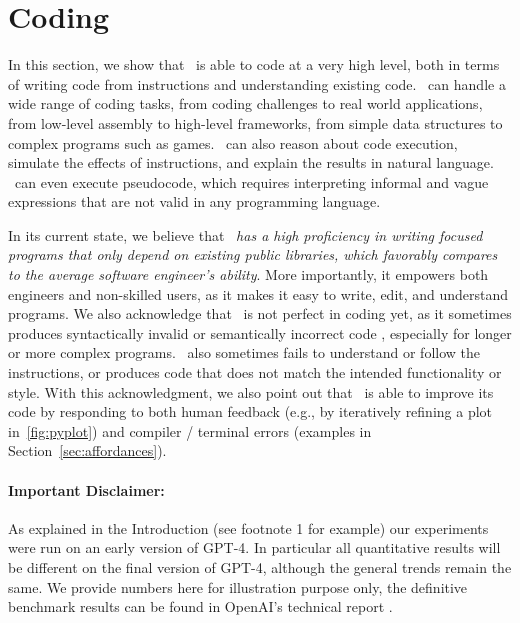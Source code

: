 \newpage
\section{Coding}
\label{sec:code}
\vspace{-3mm}
In this section, we show that \DV\ is able to code at a very high level, both in terms of writing code from instructions and understanding existing code. \DV\ can handle a wide range of coding tasks, from coding challenges to real world applications, from low-level assembly to high-level frameworks, from simple data structures to complex programs such as games. \DV\ can also reason about code execution, simulate the effects of instructions, and explain the results in natural language. \DV\ can even execute pseudocode, which requires interpreting informal and vague expressions that are not valid in any programming language.

In its current state, we believe that \DV\ \textit{has a high proficiency in writing focused programs that only depend on existing public libraries, which favorably compares to the average software engineer's ability}. More importantly, it empowers both engineers and non-skilled users, as it makes it easy to write, edit, and understand programs. We also acknowledge that \DV\ is not perfect in coding yet, as it sometimes produces syntactically invalid or semantically incorrect code%
, especially for longer or more complex programs. \DV\ also sometimes fails to understand or follow the instructions, or produces code that does not match the intended functionality or style. 
With this acknowledgment, we also point out that \DV\ is able to improve its code by responding to both human feedback (e.g., by iteratively refining a plot in~\ref{fig:pyplot}) and compiler / terminal errors (examples in Section~\ref{sec:affordances}).
\vspace{-4mm}
\paragraph{Important Disclaimer:} As explained in the Introduction (see footnote 1 for example) our experiments were run on an early version of GPT-4. In particular all quantitative results will be different on the final version of GPT-4, although the general trends remain the same. We provide numbers here for illustration purpose only, the definitive benchmark results can be found in OpenAI's technical report \cite{gpt4}.
\vspace{-2mm}



